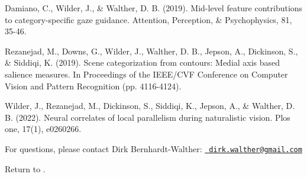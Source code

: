 Damiano, C., Wilder, J., \& Walther, D. B. (2019). Mid-\/level feature contributions to category-\/specific gaze guidance. Attention, Perception, \& Psychophysics, 81, 35-\/46.

Rezanejad, M., Downs, G., Wilder, J., Walther, D. B., Jepson, A., Dickinson, S., \& Siddiqi, K. (2019). Scene categorization from contours\+: Medial axis based salience measures. In Proceedings of the IEEE/\+CVF Conference on Computer Vision and Pattern Recognition (pp. 4116-\/4124).

Wilder, J., Rezanejad, M., Dickinson, S., Siddiqi, K., Jepson, A., \& Walther, D. B. (2022). Neural correlates of local parallelism during naturalistic vision. Plos one, 17(1), e0260266.

For questions, please contact Dirk Bernhardt-\/\+Walther\+: \href{mailto:dirk.walther@gmail.com}{\texttt{ dirk.\+walther@gmail.\+com}}

Return to . 